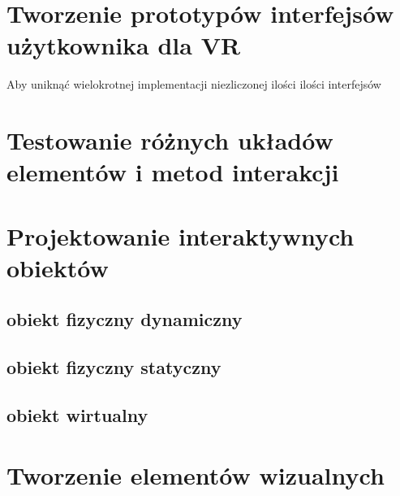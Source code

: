 \section{Tworzenie prototypów interfejsów użytkownika dla VR}
Aby uniknąć wielokrotnej implementacji niezliczonej ilości ilości interfejsów 
\section{Testowanie różnych układów elementów i metod interakcji}
\section{Projektowanie interaktywnych obiektów}
\subsection{obiekt fizyczny dynamiczny}
\subsection{obiekt fizyczny statyczny}
\subsection{obiekt wirtualny}
\section{Tworzenie elementów wizualnych}


